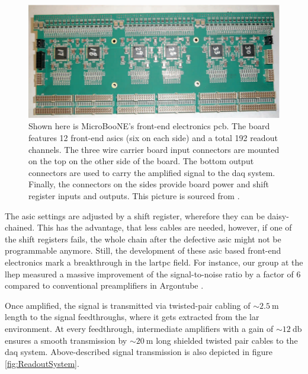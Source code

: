 \begin{figure}[htbp]
    \centering
    \includegraphics[width=1.0\textwidth]{images/MicroBooNE/ReadoutBoard.pdf}
    \caption[Front-End Electronics PCB]{Shown here is MicroBooNE's front-end electronics \gls{pcb}. The board features \num{12} front-end \glspl{asic} (six on each side) and a total \num{192} readout channels. The three wire carrier board input connectors are mounted on the top on the other side of the board. The bottom output connectors are used to carry the amplified signal to the \gls{daq} system. Finally, the connectors on the sides provide board power and shift register inputs and outputs. This picture is sourced from \cite{LArASIC2}.}
    \label{fig:ReadoutBoard}
\end{figure}
The \gls{asic} settings are adjusted by a shift register, wherefore they can be daisy-chained. This has the advantage, that less cables are needed, however, if one of the shift registers fails, the whole chain after the defective \gls{asic} might not be programmable anymore. Still, the development of these \gls{asic} based front-end electronics mark a breakthrough in the \gls{lartpc} field. For instance, our group at the \gls{lhep} measured a massive improvement of the signal-to-noise ratio by a factor of \num{6} compared to conventional preamplifiers in Argontube \cite{LArASICTestArgontube}.

Once amplified, the signal is transmitted via twisted-pair cabling of $\sim\SI{2.5}{\metre}$ length to the signal feedthroughs, where it gets extracted from the \gls{lar} environment. At every feedthrough, intermediate amplifiers with a gain of $\sim\SI{12}{\decibel}$ ensures a smooth transmission by $\sim\SI{20}{\metre}$ long shielded twisted pair cables to the \gls{daq} system\cite{MicroBooNEDetector}. Above-described signal transmission is also depicted in figure \ref{fig:ReadoutSystem}.

